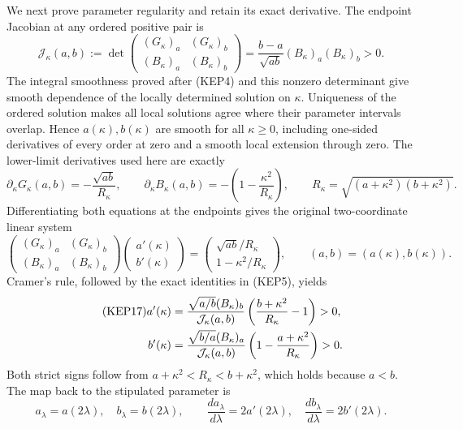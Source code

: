 \documentclass[11pt,a4paper]{article}
\begin{document}
We next prove parameter regularity and retain its exact derivative.
The endpoint Jacobian at any ordered positive pair is
\begin{equation}\tag{KEP14}
 \mathcal J_\kappa(a,b):=
 \det\begin{pmatrix}(G_\kappa)_a&(G_\kappa)_b\\
                    (B_\kappa)_a&(B_\kappa)_b\end{pmatrix}
 =\frac{b-a}{\sqrt{ab}}(B_\kappa)_a(B_\kappa)_b>0.
\end{equation}
The integral smoothness proved after (KEP4) and this nonzero determinant
give smooth dependence of the locally determined solution on $\kappa$.
Uniqueness of the ordered solution makes all local solutions agree
where their parameter intervals overlap. Hence $a(\kappa),b(\kappa)$ are smooth
for all $\kappa\geq0$, including one-sided derivatives of every order at
zero and a smooth local extension through zero. The lower-limit
derivatives used here are exactly
\begin{equation}\tag{KEP15}
 \partial_\kappa G_\kappa(a,b)=-\frac{\sqrt{ab}}{R_\kappa},\qquad
 \partial_\kappa B_\kappa(a,b)=-\left(1-\frac{\kappa^2}{R_\kappa}\right),
 \qquad R_\kappa=\sqrt{(a+\kappa^2)(b+\kappa^2)}.
\end{equation}
Differentiating both equations at the endpoints gives the original
two-coordinate linear system
\begin{equation}\tag{KEP16}
 \begin{pmatrix}(G_\kappa)_a&(G_\kappa)_b\\
                (B_\kappa)_a&(B_\kappa)_b\end{pmatrix}
 \begin{pmatrix}a'(\kappa)\\b'(\kappa)\end{pmatrix}
 =\begin{pmatrix}\sqrt{ab}/R_\kappa\\1-\kappa^2/R_\kappa\end{pmatrix},
 \qquad (a,b)=(a(\kappa),b(\kappa)).
\end{equation}
Cramer's rule, followed by the exact identities in (KEP5), yields
\begin{align}\tag{KEP17}
 a'(\kappa)&=
 \frac{\sqrt{a/b}(B_\kappa)_b}{\mathcal J_\kappa(a,b)}
       \left(\frac{b+\kappa^2}{R_\kappa}-1\right)>0,\\
 b'(\kappa)&=
 \frac{\sqrt{b/a}(B_\kappa)_a}{\mathcal J_\kappa(a,b)}
       \left(1-\frac{a+\kappa^2}{R_\kappa}\right)>0.\notag
\end{align}
Both strict signs follow from
$a+\kappa^2<R_\kappa<b+\kappa^2$, which holds because $a<b$.
The map back to the stipulated parameter is
\begin{equation}\tag{KEP18}
 a_\lambda=a(2\lambda),\quad b_\lambda=b(2\lambda),\qquad
 \frac{da_\lambda}{d\lambda}=2a'(2\lambda),\quad
 \frac{db_\lambda}{d\lambda}=2b'(2\lambda).
\end{equation}
\end{document}
